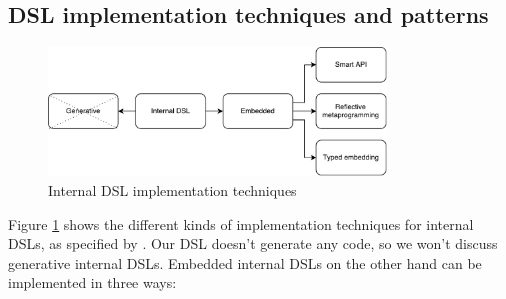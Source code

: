 \subsection{DSL implementation techniques and patterns}

\begin{figure}[!h]
    \centering
      \includegraphics[width=0.8\textwidth]{images/DSLTechniques} 
      \caption{Internal DSL implementation techniques}
    \label{fig:DSLTechniques}
\end{figure}

Figure \ref{fig:DSLTechniques} shows the different kinds of implementation techniques for internal DSLs, as specified by \cite{Ghosh:2010}. Our DSL doesn't generate any code, so we won't discuss generative internal DSLs. Embedded internal DSLs on the other hand can be implemented in three ways: 

